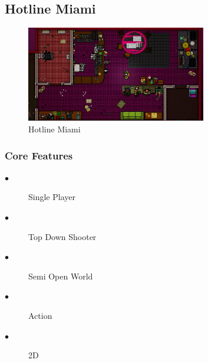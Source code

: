 \documentclass[a4paper]{scrreprt}
\begin{document}
        \subsection{Hotline Miami}

        \begin{figure}[H]
            \centering
            \includegraphics[width=0.70\textwidth]{hotline-miami.jpg}
            \caption{\label{fig:art} Hotline Miami}
        \end{figure}

        \subsubsection{Core Features}
        \begin{description}
            \item[$\bullet$] Single Player
            \item[$\bullet$] Top Down Shooter
            \item[$\bullet$] Semi Open World
            \item[$\bullet$] Action
            \item[$\bullet$] 2D
        \end{description}
            
\end{document}
